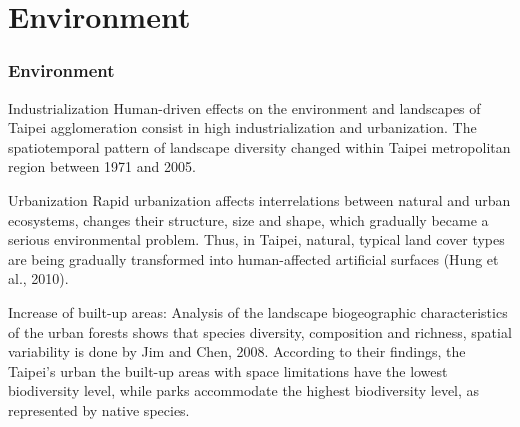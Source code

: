 \documentclass[pdflatex,compress,8pt,
	xcolor={dvipsnames,dvipsnames,svgnames,x11names,table},
	hyperref={	
	breaklinks = true, 
	pdfauthor={Lemenkova Polina}, 
	pdfsubject={Preentation}, 
	pdfcreator={Lemenkova Polina}, 
	pdfproducer={Lemenkova Polina}, 
	colorlinks=true,
	linkcolor=Gold1, 
	citecolor=NavyBlue, 
	urlcolor = NavyBlue, 
	breaklinks = true}]{beamer}
\begin{document}
\section{Environment}
\begin{frame}\frametitle{Environment}

\begin{alertblock}{Industrialization}
Human-driven effects on the environment and landscapes of Taipei agglomeration consist in \alert{high industrialization and urbanization}.
The spatiotemporal pattern of landscape diversity changed within Taipei metropolitan region between 1971 and 2005.
\end{alertblock}

\begin{block}{Urbanization}
Rapid urbanization affects \alert{interrelations between natural and urban ecosystems}, changes their \alert{structure, size} and \alert{shape}, which gradually became a serious environmental problem. Thus, in Taipei, natural, typical land cover types are being gradually transformed into human-affected artificial surfaces (Hung et al., 2010).
\end{block}

\begin{examples}{Increase of built-up areas:}
Analysis of the landscape biogeographic characteristics of the urban forests shows that species diversity, composition and richness, spatial variability is done by Jim and Chen, 2008. According to their findings, the Taipei's urban the built-up areas with space limitations have the \alert{lowest biodiversity level}, while parks accommodate the \alert{highest biodiversity level}, as represented by native species.
\end{examples}

\end{frame}


\end{document}
